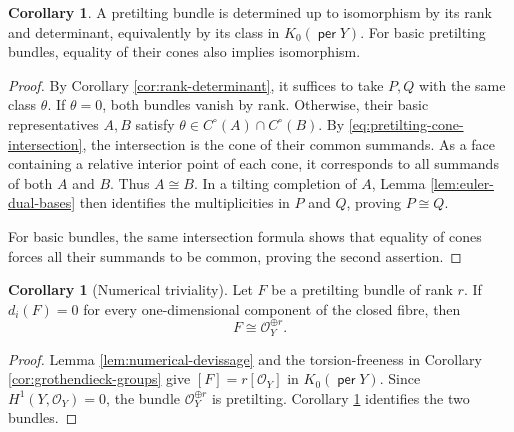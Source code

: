 \documentclass[a4paper,reqno]{amsart}
\def\O{\mathcal{O}}
\DeclareMathOperator{\per}{\mathsf{per}}
\theoremstyle{definition}
\newtheorem{Cor}[Thm]{Corollary}
\begin{document}
\begin{Cor}\label{cor:class-determines-pretilting}
A pretilting bundle is determined up to isomorphism by its rank and determinant, equivalently by its class in $K_0(\per Y)$. For basic pretilting bundles, equality of their cones also implies isomorphism.
\end{Cor}
\begin{proof}
By Corollary \ref{cor:rank-determinant}, it suffices to take $P,Q$ with the same class $\theta$. If $\theta=0$, both bundles vanish by rank. Otherwise, their basic representatives $A,B$ satisfy $\theta\in C^\circ(A)\cap C^\circ(B)$. By \eqref{eq:pretilting-cone-intersection}, the intersection is the cone of their common summands. As a face containing a relative interior point of each cone, it corresponds to all summands of both $A$ and $B$. Thus $A\cong B$. In a tilting completion of $A$, Lemma \ref{lem:euler-dual-bases} then identifies the multiplicities in $P$ and $Q$, proving $P\cong Q$.

For basic bundles, the same intersection formula shows that equality of cones forces all their summands to be common, proving the second assertion.
\end{proof}

\begin{Cor}[Numerical triviality]\label{cor:numerically-trivial-pretilting}
Let $F$ be a pretilting bundle of rank $r$. If $d_i(F)=0$ for every one-dimensional component of the closed fibre, then
\[
F\cong\O_Y^{\oplus r}.
\]
\end{Cor}
\begin{proof}
Lemma \ref{lem:numerical-devissage} and the torsion-freeness in Corollary \ref{cor:grothendieck-groups} give $[F]=r[\O_Y]$ in $K_0(\per Y)$. Since $H^1(Y,\O_Y)=0$, the bundle $\O_Y^{\oplus r}$ is pretilting. Corollary \ref{cor:class-determines-pretilting} identifies the two bundles.
\end{proof}
\end{document}
